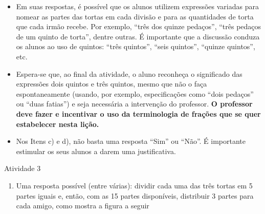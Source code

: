 \begin{multicols}{2}
\begin{itemize}
    \item       Em suas respostas, é possível que os alunos utilizem expressões variadas para nomear as partes das tortas em cada divisão e para as quantidades de torta que cada irmão recebe. Por exemplo,       ``três dos quinze pedaços'',       ``três pedaços de um quinto de torta'', dentre outras. É importante que a discussão conduza os alunos ao uso de quintos:       ``três quintos'',       ``seis quintos'',       ``quinze quintos'', etc.
    \item       Espera-se que, ao final da atividade, o aluno reconheça o significado das expressões dois quintos e três quintos, mesmo que não o faça espontaneamente (usando, por exemplo, especificações como       ``dois pedaços''     ou       ``duas fatias'') e seja necessária a intervenção do professor. {\bf O professor deve fazer e incentivar o uso da terminologia de frações que se quer estabelecer nesta lição.}
    \item       Nos Itens c) e d), não basta uma resposta       ``Sim''     ou       ``Não''. É importante estimular os seus alunos a darem uma justificativa.
\end{itemize} %



  \vspace{.1cm}



\begin{resposta*}{Atividade 3}
\begin{enumerate} [\quad a)] %
    \item       Uma resposta possível (entre várias): dividir cada uma das três tortas em 5 partes iguais e, então, com as 15 partes disponíveis, distribuir 3 partes para cada amigo, como mostra a figura a seguir



\end{enumerate}
\end{resposta*}
\end{multicols}
